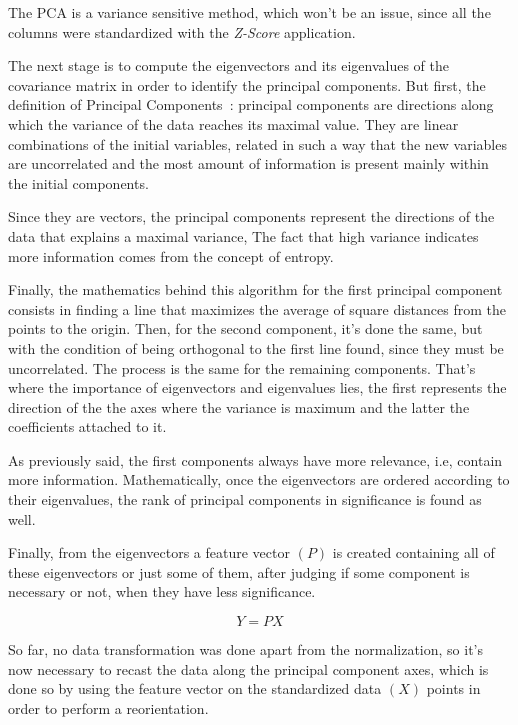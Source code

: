 \documentclass[conference]{IEEEtran}
\begin{document}
The PCA is a variance sensitive method, which won't be an issue, since all the columns were standardized with the \textit{Z-Score} application. 

The next stage is to compute the eigenvectors and its eigenvalues of the covariance matrix in order to identify the principal components. But first, the definition of Principal Components~\cite{Ringner2001}: principal components are directions along which the variance of the data reaches its maximal value. They are linear combinations of the initial variables, related in such a way that the new variables are uncorrelated and the most amount of information is present mainly within the initial components.

Since they are vectors, the principal components represent the directions of the data that explains a maximal variance, The fact that high variance indicates more 
information comes from the concept of entropy. 

Finally, the mathematics behind this algorithm for the first principal component consists in finding a line that maximizes the average of square distances from the points to the origin. Then, for the second component, it's done the same, but with the condition of being orthogonal to the first line found, since they must be uncorrelated. The process is the same for the remaining components. That's where the importance of eigenvectors and eigenvalues lies, the first represents the direction of the the axes where the variance is maximum and the latter the coefficients attached to it. 

As previously said, the first components always have more relevance, i.e, contain more information. Mathematically, once the eigenvectors are ordered according to their eigenvalues, the rank of principal components in significance is found as well.

Finally, from the eigenvectors a feature vector $(P)$ is created containing all of these eigenvectors or just some of them, after judging if some component is necessary or not, when they have less significance. 

\begin{equation}
    Y = P X
\end{equation}

So far, no data transformation was done apart from the normalization, so it's now necessary to recast the data along the principal component axes, which is done so by using the feature vector on the standardized data $(X)$ points in order to perform a reorientation.
\end{document}
